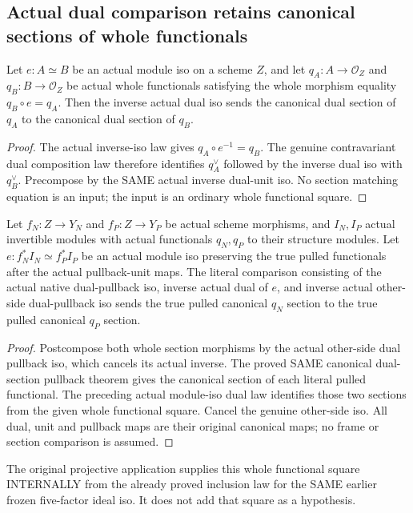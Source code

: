 \subsection{Actual dual comparison retains canonical sections of whole functionals}
\begin{lemma}
\label{lem:seven-dual-canonical-section-iso}
\leanok
Let $e:A\simeq B$ be an actual module iso on a scheme $Z$, and let
$q_A:A\to\mathcal O_Z$ and $q_B:B\to\mathcal O_Z$ be actual whole
functionals satisfying the whole morphism equality $q_B\circ e=q_A$.
Then the inverse actual dual iso sends the canonical dual section of
$q_A$ to the canonical dual section of $q_B$.
\end{lemma}
\begin{proof}
The actual inverse-iso law gives $q_A\circ e^{-1}=q_B$.
The genuine contravariant dual composition law therefore identifies
$q_A^\vee$ followed by the inverse dual iso with $q_B^\vee$.
Precompose by the SAME actual inverse dual-unit iso. No section matching
equation is an input; the input is an ordinary whole functional square.
\end{proof}
\begin{theorem}
\label{thm:seven-pulled-dual-comparison-canonical-section}
\leanok
{}
Let $f_N:Z\to Y_N$ and $f_P:Z\to Y_P$ be actual scheme morphisms, and
$I_N,I_P$ actual invertible modules with actual functionals $q_N,q_P$
to their structure modules. Let $e:f_N^*I_N\simeq f_P^*I_P$ be an
actual module iso preserving the true pulled functionals after the
actual pullback-unit maps. The literal comparison consisting of the
actual native dual-pullback iso, inverse actual dual of $e$, and inverse
actual other-side dual-pullback iso sends the true pulled canonical
$q_N$ section to the true pulled canonical $q_P$ section.
\end{theorem}
\begin{proof}
Postcompose both whole section morphisms by the actual other-side dual
pullback iso, which cancels its actual inverse. The proved SAME canonical
dual-section pullback theorem gives the canonical section of each
literal pulled functional. The preceding actual module-iso dual law
identifies those two sections from the given whole functional square.
Cancel the genuine other-side iso. All dual, unit and pullback maps are
their original canonical maps; no frame or section comparison is assumed.
\end{proof}
The original projective application supplies this whole functional square
INTERNALLY from the already proved inclusion law for the SAME earlier
frozen five-factor ideal iso. It does not add that square as a hypothesis.

